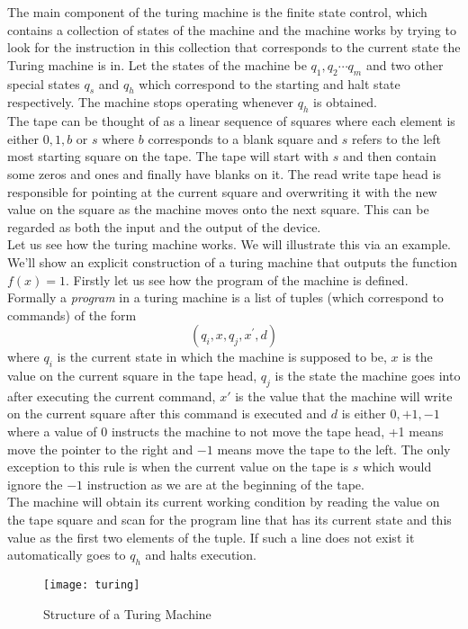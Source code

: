 The main component of the turing machine is the finite state control, which contains a collection of states of the machine and the machine works by trying to look for the instruction in this collection that corresponds to the current state the Turing machine is in.
Let the states of the machine be $q_1, q_2 \cdots q_m$ and two other special states $q_s$ and $q_h$ which correspond to the starting and halt state respectively. The machine stops operating whenever $q_h$ is obtained. \\ The tape can be thought of as a linear sequence of squares where each element is either $0, 1, b$ or $s$ where $b$ corresponds to a blank square and $s$ refers to the left most starting square on the tape. The tape will start with $s$ and then contain some zeros and ones and finally have blanks on it. The read write tape head is responsible for pointing at the current square and overwriting it with the new value on the square as the machine moves onto the next square. This can be regarded as both the input and the output of the device. 
\\ Let us see how the turing machine works. We will illustrate this via an example. We'll show an explicit construction of a turing machine that outputs the function $f(x) = 1$.
Firstly let us see how the program of the machine is defined. Formally a \textit{program} in a turing machine is a list of tuples (which correspond to commands) of the form 
$$ \left( q_i, x, q_j, x^{'}, d \right)$$
where $q_i$ is the current state in which the machine is supposed to be, $x$ is the value on the current square in the tape head, $q_j$ is the state the machine goes into after executing the current command, $x'$ is the value that the machine will write on the current square after this command is executed and $d$ is either $0, +1, -1$ where a value of $0$ instructs the machine to not move the tape head, +1 means move the pointer to the right and $-1$ means move the tape to the left. The only exception to this rule is when the current value on the tape is $s$ which would ignore the $-1$ instruction as we are at the beginning of the tape.
\\The machine will obtain its current working condition by reading the value on the tape square and scan for the program line that has its current state and this value as the first two elements of the tuple. If such a line does not exist it automatically goes to $q_h$ and halts execution.
\begin{figure}[htp]
    \centering
    \caption{Structure of a Turing Machine}
    \texttt{[image: turing]}
\end{figure}
